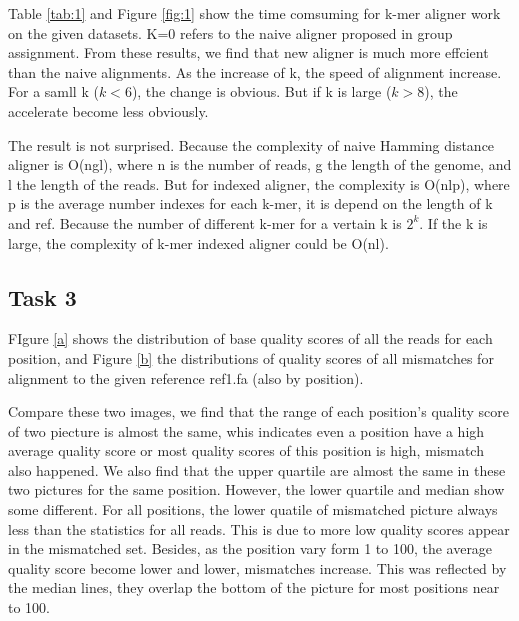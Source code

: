 \documentclass[a4paper]{article}
\begin{document}
Table \ref{tab:1} and Figure \ref{fig:1} show the time comsuming for k-mer aligner work on the given datasets. K=0 refers to the naive aligner proposed in group assignment. From these results, we find that new aligner is much more effcient than the naive alignments. As the increase of k, the speed of alignment increase. For a samll k ($k<6$), the change is obvious. But if k is large ($k>8$), the accelerate become less obviously.

The result is not surprised. Because the  complexity of naive Hamming distance aligner is O(ngl), where n is the number of reads, g the length of the genome, and l the length of the reads. But for indexed aligner, the complexity is O(nlp), where p is the average number indexes for each k-mer, it is depend on the length of k and ref. Because the number of different k-mer for a vertain k is $2^k$. If the k is large, the complexity of k-mer indexed aligner could be O(nl).

\subsection{Task 3}

FIgure \ref{a}  shows the distribution of base quality scores of all the reads for each position, and Figure \ref{b} the distributions of quality scores of all mismatches for alignment to the given reference ref1.fa  (also by position). 

Compare these two images, we find that the range of each position's quality score of two piecture is almost the same, whis indicates even a position have a high average quality score or most quality scores of this position is high, mismatch also happened. We also find that the upper quartile are almost the same in these two pictures for the same position. However, the lower quartile and median show some different. For all positions, the lower quatile of mismatched picture always less than the statistics for all reads. This is due to more low quality scores appear in the mismatched set.  
Besides, as the position vary form 1 to 100, the average quality score become lower and lower, mismatches increase. This was reflected by the median lines, they overlap the bottom of the picture for most positions near to 100.
\end{document}
